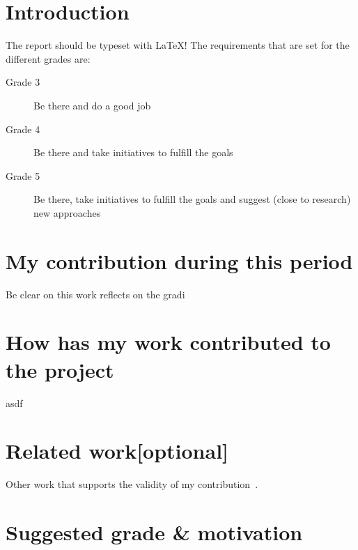 \section{Introduction}
The report should be typeset with \LaTeX !
The requirements that are set for the different grades are:
\begin{description}
\item[Grade 3] Be there and do a good job
\item[Grade 4] Be there and take initiatives to fulfill the goals
\item[Grade 5] Be there, take initiatives to fulfill the goals and suggest (close to research) new approaches
\end{description}

\section{My contribution during this period}
Be clear on this work reflects on the gradi
\section{How has my work contributed to the project}
asdf 

\section{Related work[optional]}
Other work that supports the validity of my contribution~\cite{web:otillo}.\\

\section{Suggested grade \& motivation}

